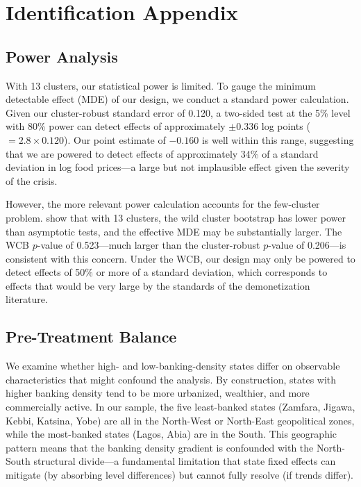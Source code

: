 \documentclass[12pt]{article}
\begin{document}
\section{Identification Appendix}
\label{app:identification}

\subsection{Power Analysis}

With 13 clusters, our statistical power is limited. To gauge the minimum detectable effect (MDE) of our design, we conduct a standard power calculation. Given our cluster-robust standard error of 0.120, a two-sided test at the 5\% level with 80\% power can detect effects of approximately $\pm 0.336$ log points ($= 2.8 \times 0.120$). Our point estimate of $-0.160$ is well within this range, suggesting that we are powered to detect effects of approximately 34\% of a standard deviation in log food prices---a large but not implausible effect given the severity of the crisis.

However, the more relevant power calculation accounts for the few-cluster problem. \citet{mackinnon2018wild} show that with 13 clusters, the wild cluster bootstrap has lower power than asymptotic tests, and the effective MDE may be substantially larger. The WCB $p$-value of 0.523---much larger than the cluster-robust $p$-value of 0.206---is consistent with this concern. Under the WCB, our design may only be powered to detect effects of 50\% or more of a standard deviation, which corresponds to effects that would be very large by the standards of the demonetization literature.

\subsection{Pre-Treatment Balance}

We examine whether high- and low-banking-density states differ on observable characteristics that might confound the analysis. By construction, states with higher banking density tend to be more urbanized, wealthier, and more commercially active. In our sample, the five least-banked states (Zamfara, Jigawa, Kebbi, Katsina, Yobe) are all in the North-West or North-East geopolitical zones, while the most-banked states (Lagos, Abia) are in the South. This geographic pattern means that the banking density gradient is confounded with the North-South structural divide---a fundamental limitation that state fixed effects can mitigate (by absorbing level differences) but cannot fully resolve (if trends differ).
\end{document}
